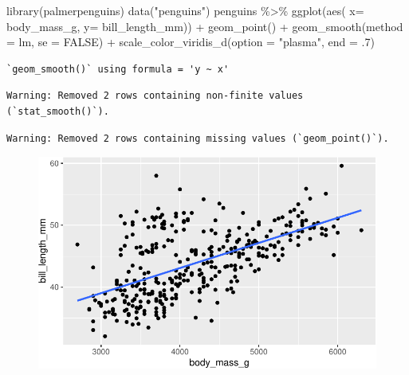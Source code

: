 \documentclass[
  letterpaper,
  DIV=11,
  numbers=noendperiod]{scrreprt}
\newenvironment{Shaded}{\begin{snugshade}}{\end{snugshade}}
\newcommand{\AttributeTok}[1]{\textcolor[rgb]{0.40,0.45,0.13}{#1}}
\newcommand{\ConstantTok}[1]{\textcolor[rgb]{0.56,0.35,0.01}{#1}}
\newcommand{\DecValTok}[1]{\textcolor[rgb]{0.68,0.00,0.00}{#1}}
\newcommand{\FunctionTok}[1]{\textcolor[rgb]{0.28,0.35,0.67}{#1}}
\newcommand{\NormalTok}[1]{\textcolor[rgb]{0.00,0.23,0.31}{#1}}
\newcommand{\SpecialCharTok}[1]{\textcolor[rgb]{0.37,0.37,0.37}{#1}}
\newcommand{\StringTok}[1]{\textcolor[rgb]{0.13,0.47,0.30}{#1}}
\begin{document}
\begin{Shaded}
\begin{Highlighting}[]
\FunctionTok{library}\NormalTok{(palmerpenguins)}
\FunctionTok{data}\NormalTok{(}\StringTok{"penguins"}\NormalTok{)}
\NormalTok{penguins }\SpecialCharTok{\%\textgreater{}\%} \FunctionTok{ggplot}\NormalTok{(}\FunctionTok{aes}\NormalTok{( }\AttributeTok{x=}\NormalTok{ body\_mass\_g, }\AttributeTok{y=}\NormalTok{ bill\_length\_mm)) }\SpecialCharTok{+}
  \FunctionTok{geom\_point}\NormalTok{() }\SpecialCharTok{+}
  \FunctionTok{geom\_smooth}\NormalTok{(}\AttributeTok{method =}\NormalTok{ lm, }\AttributeTok{se =} \ConstantTok{FALSE}\NormalTok{) }\SpecialCharTok{+}
  \FunctionTok{scale\_color\_viridis\_d}\NormalTok{(}\AttributeTok{option =} \StringTok{"plasma"}\NormalTok{, }\AttributeTok{end =}\NormalTok{ .}\DecValTok{7}\NormalTok{)}
\end{Highlighting}
\end{Shaded}

\begin{verbatim}
`geom_smooth()` using formula = 'y ~ x'
\end{verbatim}

\begin{verbatim}
Warning: Removed 2 rows containing non-finite values (`stat_smooth()`).
\end{verbatim}

\begin{verbatim}
Warning: Removed 2 rows containing missing values (`geom_point()`).
\end{verbatim}

\begin{figure}[H]

{\centering \includegraphics{./10-model_selection_files/figure-pdf/unnamed-chunk-23-1.pdf}

}

\end{figure}
\end{document}

